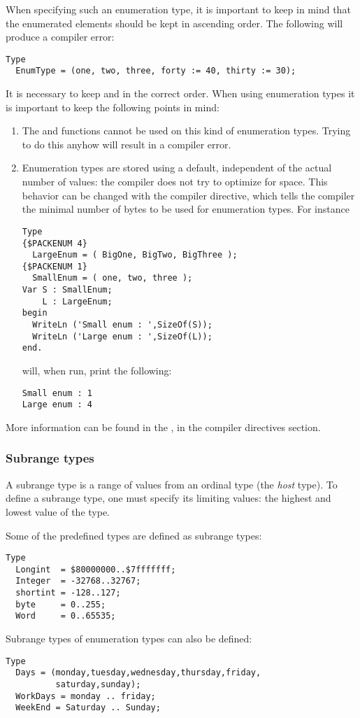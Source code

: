 When specifying such an enumeration type, it is important to keep in mind
that the enumerated elements should be kept in ascending order. The
following will produce a compiler error:
\begin{verbatim}
Type
  EnumType = (one, two, three, forty := 40, thirty := 30);
\end{verbatim}
It is necessary to keep  and  in the correct order.
When using enumeration types it is important to keep the following points
in mind:
\begin{enumerate}
\item The  and  functions cannot be used on
this kind of enumeration types. Trying to do this anyhow will result in a
compiler error.
\item Enumeration types are stored using a default, independent of the
actual number of values: the compiler does not try to optimize for space.
This behavior can be changed with the  compiler
directive, which tells the compiler the minimal number of bytes to be
used for enumeration types.
For instance
\begin{verbatim}
Type
{$PACKENUM 4}
  LargeEnum = ( BigOne, BigTwo, BigThree );
{$PACKENUM 1}
  SmallEnum = ( one, two, three );
Var S : SmallEnum;
    L : LargeEnum;
begin
  WriteLn ('Small enum : ',SizeOf(S));
  WriteLn ('Large enum : ',SizeOf(L));
end.
\end{verbatim}
will, when run, print the following:
\begin{verbatim}
Small enum : 1
Large enum : 4
\end{verbatim}
\end{enumerate}
More information can be found in the \progref, in the compiler directives
section.
%
%
\subsubsection{Subrange types}
A subrange type is a range of values from an ordinal type (the {\em host}
type). To define a subrange type, one must specify its limiting values:
the highest and lowest value of the type.

Some of the predefined  types are defined as subrange types:
\begin{verbatim}
Type
  Longint  = $80000000..$7fffffff;
  Integer  = -32768..32767;
  shortint = -128..127;
  byte     = 0..255;
  Word     = 0..65535;
\end{verbatim}
Subrange types of enumeration types can also be defined:
\begin{verbatim}
Type
  Days = (monday,tuesday,wednesday,thursday,friday,
          saturday,sunday);
  WorkDays = monday .. friday;
  WeekEnd = Saturday .. Sunday;
\end{verbatim}
%
